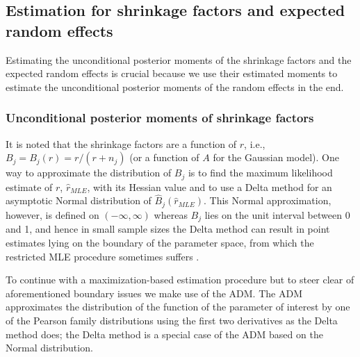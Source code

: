 \documentclass[article]{jss}
\begin{document}
\subsection[shrinkage]{Estimation for shrinkage factors and expected random effects}\label{shrinkage}

Estimating the unconditional posterior moments of the shrinkage factors and the expected random effects is crucial because we use their estimated moments to estimate the unconditional posterior moments of the random effects in the end. 

\subsubsection{Unconditional posterior moments of shrinkage factors}  It is noted that  the shrinkage factors  are a function of $r$, i.e., $B_{j}= B_{j}(r)=r/(r+n_{j})$ (or a function of $A$ for the Gaussian model). One way to approximate the distribution of $B_{j}$ is to find the maximum likelihood estimate of $r$, $\hat{r}_{MLE}$, with its Hessian value and to use a Delta method for an asymptotic Normal distribution of $\hat{B}_{j}(\hat{r}_{MLE})$. This Normal approximation, however, is defined on $(-\infty, \infty)$ whereas $B_{j}$ lies on the unit interval between 0 and 1, and hence in small sample sizes the Delta method can result in point estimates lying on the boundary of the parameter space, from which the restricted MLE procedure sometimes suffers \citep{tang2011, kelly2014advances}.

To continue with a maximization-based estimation procedure but to steer clear of aforementioned boundary issues we make use of the ADM. The ADM approximates the distribution of the function of the parameter of interest by one of the Pearson family distributions using the first two derivatives as the Delta method does; the Delta method is a special case of the ADM based on the Normal distribution. 

\end{document}
